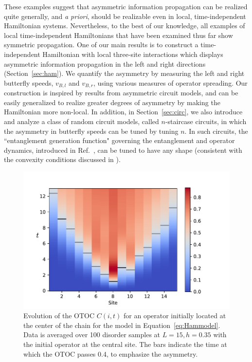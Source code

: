 \documentclass[aps,prx,reprint,superscriptaddress, longbibliography]{revtex4-1}
\begin{document}
These examples suggest that asymmetric information propagation can be realized quite generally, and \emph{a priori}, should be realizable even in local, time-independent Hamiltonian systems. Nevertheless, to the best of our knowledge, all examples of local time-independent Hamiltonians that have been examined thus far show symmetric propagation. One of our main results is to construct a time-independent Hamiltonian with local three-site interactions which displays asymmetric information propagation in the left and right directions (Section~\ref{sec:ham}). We quantify the asymmetry by measuring the left and right butterfly speeds, $v_{B, l}$ and  $v_{B,r}$, using various measures of operator spreading. 
Our construction is inspired by results from asymmetric circuit models, and can be easily generalized to realize greater degrees of asymmetry by making the Hamiltonian more non-local. In addition, in Section~\ref{sec:circ}, we also introduce and analyze a class of random circuit models,  called $n$-staircase circuits, in which the asymmetry in butterfly speeds can be tuned by tuning $n$. In such circuits, the ``entanglement generation function" governing the entanglement and operator dynamics, introduced in Ref.~\cite{Cheryne}, can be tuned to have any shape (consistent with the convexity conditions discussed in \cite{Cheryne}). 

\begin{figure}
	\includegraphics[width=\columnwidth]{colorplot}
	\caption{Evolution of the OTOC $C(i,t)$ for an operator initially located at the center of the chain for the model in Equation~\ref{eq:Hammodel}. Data is averaged over 100 disorder samples at $L=15, h=0.35$ with the initial operator at the central site. The bars indicate the time at which the OTOC passes 0.4, to emphasize the asymmetry.}
	\label{fig:colorplot}
\end{figure}
\end{document}

